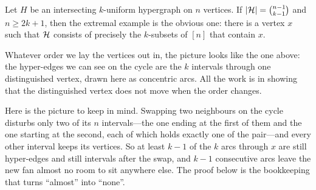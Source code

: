 \begin{boxtheorem} \label{Ch3:Thm:EKR_Extremal}
    Let $H$ be an intersecting $k$-uniform hypergraph on $n$ vertices. If $\left\lvert \mathcal{H} \right\rvert = \binom{n-1}{k-1}$ and $n \geq 2k + 1$, then the extremal example is the obvious one: there is a vertex $x$ such that $\mathcal{H}$ consists of precisely the $k$-subsets of $[n]$ that contain $x$.
\end{boxtheorem}

\begin{figure}[H]
    \centering
\end{figure}

Whatever order we lay the vertices out in, the picture looks like the one above: the hyper-edges we can see on the cycle are the $k$ intervals through one distinguished vertex, drawn here as concentric arcs. All the work is in showing that the distinguished vertex does not move when the order changes.


Here is the picture to keep in mind. Swapping two neighbours on the cycle disturbs only two of its $n$ intervals---the one ending at the first of them and the one starting at the second, each of which holds exactly one of the pair---and every other interval keeps its vertices. So at least $k - 1$ of the $k$ arcs through $x$ are still hyper-edges and still intervals after the swap, and $k - 1$ consecutive arcs leave the new fan almost no room to sit anywhere else. The proof below is the bookkeeping that turns ``almost'' into ``none''.

\begin{figure}[H]
    \centering
\end{figure}

